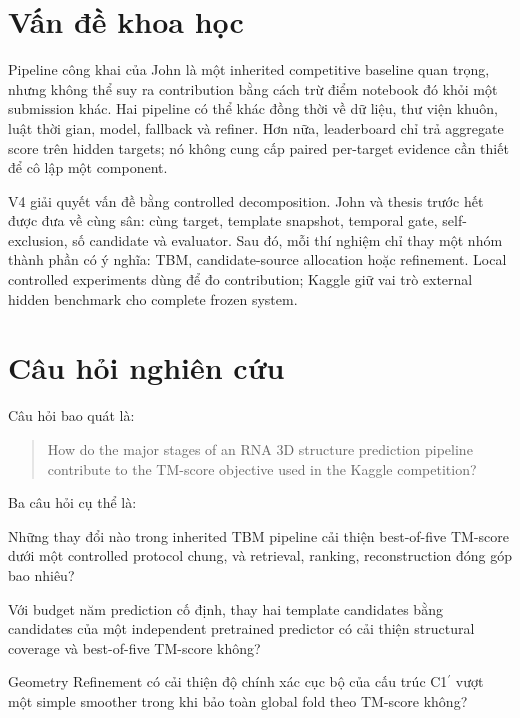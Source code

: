 \documentclass[12pt,a4paper,oneside]{report}
\newcommand{\cprime}{C1$^{\prime}$}
\begin{document}
\section{Vấn đề khoa học}

Pipeline công khai của John là một inherited competitive baseline quan trọng, nhưng
không thể suy ra contribution bằng cách trừ điểm notebook đó khỏi một submission khác.
Hai pipeline có thể khác đồng thời về dữ liệu, thư viện khuôn, luật thời gian, model,
fallback và refiner. Hơn nữa, leaderboard chỉ trả aggregate score trên hidden targets;
nó không cung cấp paired per-target evidence cần thiết để cô lập một component.

V4 giải quyết vấn đề bằng controlled decomposition. John và thesis trước hết được đưa
về cùng sân: cùng target, template snapshot, temporal gate, self-exclusion, số candidate
và evaluator. Sau đó, mỗi thí nghiệm chỉ thay một nhóm thành phần có ý nghĩa: TBM,
candidate-source allocation hoặc refinement. Local controlled experiments dùng để đo
contribution; Kaggle giữ vai trò external hidden benchmark cho complete frozen system.

\section{Câu hỏi nghiên cứu}

Câu hỏi bao quát là:

\begin{quote}
How do the major stages of an RNA 3D structure prediction pipeline contribute to the
TM-score objective used in the Kaggle competition?
\end{quote}

Ba câu hỏi cụ thể là:

\begin{description}[leftmargin=1.5cm,style=nextline]
  \item[RQ1.] Những thay đổi nào trong inherited TBM pipeline cải thiện best-of-five
  TM-score dưới một controlled protocol chung, và retrieval, ranking, reconstruction
  đóng góp bao nhiêu?
  \item[RQ2.] Với budget năm prediction cố định, thay hai template candidates bằng
  candidates của một independent pretrained predictor có cải thiện structural coverage
  và best-of-five TM-score không?
  \item[RQ3.] Geometry Refinement có cải thiện độ chính xác cục bộ của cấu trúc
  \cprime{} vượt một simple smoother trong khi bảo toàn global fold theo TM-score không?
\end{description}
\end{document}
